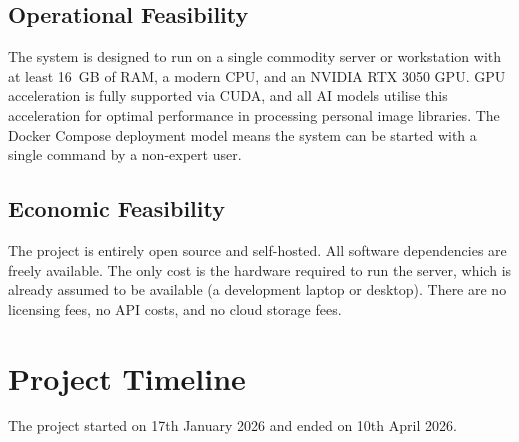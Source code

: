 \documentclass[12pt,a4paper,oneside]{report}
\begin{document}
\subsection{Operational Feasibility}
The system is designed to run on a single commodity server or workstation
with at least 16~GB of RAM, a modern CPU, and an NVIDIA RTX 3050 GPU. GPU acceleration
is fully supported via CUDA, and all AI models utilise this acceleration
for optimal performance in processing personal image libraries. The Docker Compose deployment model means the system
can be started with a single command by a non-expert user.

\subsection{Economic Feasibility}
The project is entirely open source and self-hosted.  All software
dependencies are freely available.  The only cost is the hardware required
to run the server, which is already assumed to be available (a development
laptop or desktop).  There are no licensing fees, no API costs, and no
cloud storage fees.

\clearpage

\section{Project Timeline}

The project started on 17th January 2026 and ended on 10th April 2026.
\end{document}
